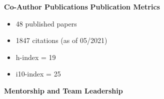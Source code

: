 \documentclass{article}
\begin{document}
{\large  \textbf{Co-Author Publications}}
\vspace{-1em}\vspace{1mm}
\begingroup
  \setlength\bibitemsep{0pt}
  \nocite{*}
  \printbibliography[keyword=coauthor, heading=none]
\endgroup
%
\vspace{0.5em}
%
{\large  \textbf{Publication Metrics}}
\begin{adjustwidth}{5mm}{}
  \begin{multicols}{2}
    \begin{itemize}[noitemsep,topsep=0pt, leftmargin=0mm]
      \item 48 published papers
      \item 1847 citations (as of 05/2021)
      \item h-index = 19
      \item i10-index = 25
    \end{itemize}
  \end{multicols}
\end{adjustwidth}
\vspace{3mm}
{\large  \textbf{Mentorship and Team Leadership}}
\end{document}
